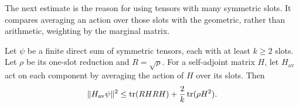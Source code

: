 The next estimate is the reason for using tensors with many symmetric
slots.  It compares averaging an action over those slots with the
geometric, rather than arithmetic, weighting by the marginal matrix.

\begin{lemma}\label{lem:matrix-copied-slots}
Let $\psi$ be a finite direct sum of symmetric tensors, each with at least
$k\ge2$ slots.  Let $\rho$ be its one-slot reduction and $R=\sqrt\rho$.
For a self-adjoint matrix $H$, let $H_{\mathrm{av}}$ act on each component
by averaging the action of $H$ over its slots.  Then
\begin{equation}\label{eq:matrix-copied-slots}
 \|H_{\mathrm{av}}\psi\|^2
 \le\operatorname{tr}(RHRH)+\frac{2}{k}\operatorname{tr}(\rho H^2).
\end{equation}
\end{lemma}
